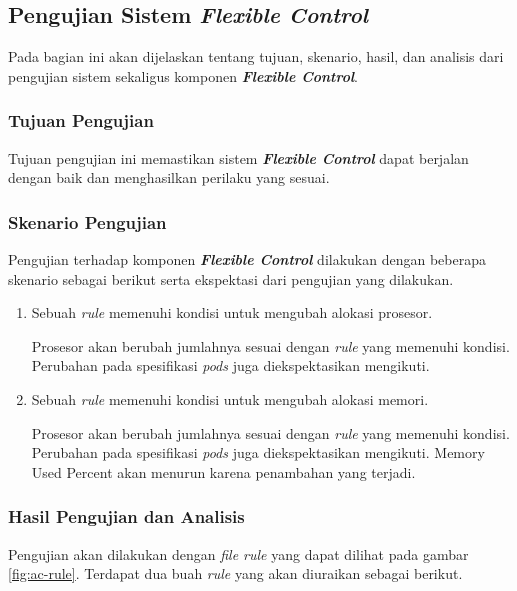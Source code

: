 \subsection{Pengujian Sistem \textit{Flexible Control}}

Pada bagian ini akan dijelaskan tentang tujuan, skenario, hasil, dan analisis dari pengujian sistem sekaligus komponen \textbf{\textit{Flexible Control}}.

\subsubsection{Tujuan Pengujian}

Tujuan pengujian ini memastikan sistem \textbf{\textit{Flexible Control}} dapat berjalan dengan baik dan menghasilkan perilaku yang sesuai.

\subsubsection{Skenario Pengujian}

Pengujian terhadap komponen \textbf{\textit{Flexible Control}} dilakukan dengan beberapa skenario sebagai berikut serta ekspektasi dari pengujian yang dilakukan.
\begin{enumerate}
    \item Sebuah \textit{rule} memenuhi kondisi untuk mengubah alokasi prosesor.
    
    Prosesor akan berubah jumlahnya sesuai dengan \textit{rule} yang memenuhi kondisi. Perubahan pada spesifikasi \textit{pods} juga diekspektasikan mengikuti.

    \item Sebuah \textit{rule} memenuhi kondisi untuk mengubah alokasi memori.
    
    Prosesor akan berubah jumlahnya sesuai dengan \textit{rule} yang memenuhi kondisi. Perubahan pada spesifikasi \textit{pods} juga diekspektasikan mengikuti. Memory Used Percent akan menurun karena penambahan yang terjadi.
\end{enumerate}

\subsubsection{Hasil Pengujian dan Analisis}

Pengujian akan dilakukan dengan \textit{file rule} yang dapat dilihat pada gambar \ref{fig:ac-rule}. Terdapat dua buah \textit{rule} yang akan diuraikan sebagai berikut.

